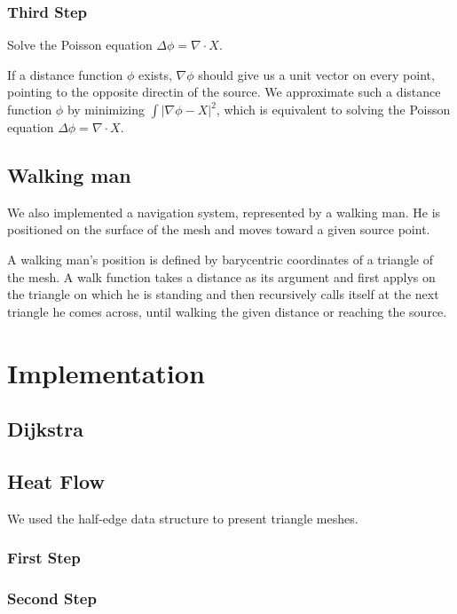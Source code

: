 \documentclass[a4paper,12pt,twoside]{article}
\begin{document}
\subsubsection{Third Step}

Solve the Poisson equation $\Delta \phi = \nabla \cdot X$.

If a distance function $\phi$ exists, $\nabla \phi$ should give us a unit vector on every point, pointing to the opposite directin of the source. We approximate such a distance function $\phi$ by minimizing $\int \left | \nabla \phi - X \right |^{2}$, which is equivalent to solving the Poisson equation $\Delta \phi = \nabla \cdot X$.

\subsection{Walking man}

We also implemented a navigation system, represented by a walking man. He is positioned on the surface of the mesh and moves toward a given source point. 

A walking man's position is defined by barycentric coordinates of a triangle of the mesh. A walk function takes a distance as its argument and first applys on the triangle on which he is standing and then recursively calls itself at the next triangle he comes across, until walking the given distance or reaching the source.

\section{Implementation}

\subsection{Dijkstra}

\subsection{Heat Flow}

We used the half-edge data structure to present triangle meshes.

\subsubsection{First Step}



\subsubsection{Second Step}
\end{document}
